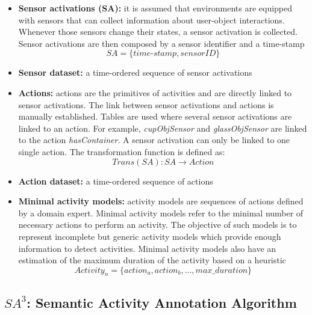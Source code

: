 \begin{itemize}
 \item \textbf{Sensor activations (SA):} it is assumed that environments are equipped with sensors that can collect information about user-object interactions. Whenever those sensors change their states, a sensor activation is collected. Sensor activations are then composed by a sensor identifier and a time-stamp
 \begin{equation*}
  SA = \{time\text{-}stamp, sensorID\}
 \end{equation*}
 \item \textbf{Sensor dataset:} a time-ordered sequence of sensor activations
 \item \textbf{Actions:} actions are the primitives of activities and are directly linked to sensor activations. The link between sensor activations and actions is manually established. Tables are used where several sensor activations are linked to an action. For example, \textit{cupObjSensor} and \textit{glassObjSensor} are linked to the action \textit{hasContainer}. A sensor activation can only be linked to one single action. The transformation function is defined as:
 \begin{equation*}
  Trans(SA) : SA \rightarrow Action
 \end{equation*}

 \item \textbf{Action dataset:} a time-ordered sequence of actions
 \item \textbf{Minimal activity models:} activity models are sequences of actions defined by a domain expert. Minimal activity models refer to the minimal number of necessary actions to perform an activity. The objective of such models is to represent incomplete but generic activity models which provide enough information to detect activities. Minimal activity models also have an estimation of the maximum duration of the activity based on a heuristic %
 \begin{equation*}
  Activity_n = \{action_a, action_b, \ldots , max\_duration\}
 \end{equation*}

\end{itemize}


\subsection{$SA^3$: Semantic Activity Annotation Algorithm}

